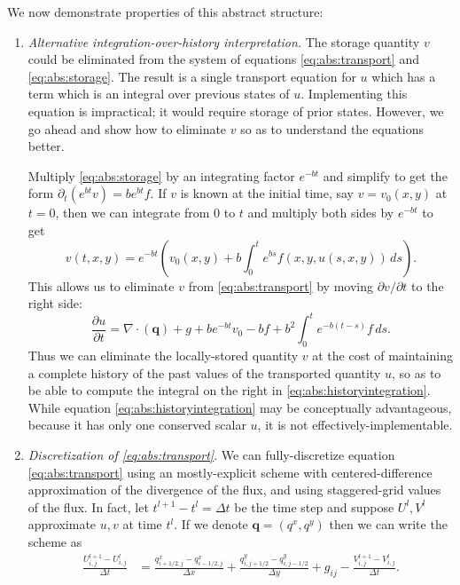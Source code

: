 \documentclass[11pt,final]{amsart}
\newcommand\bq{\mathbf{q}}
\newcommand{\Div}{\nabla\cdot}
\begin{document}
We now demonstrate properties of this abstract structure:

\renewcommand{\labelenumi}{\arabic{enumi}.\quad}

\begin{enumerate}
\item  \emph{Alternative integration-over-history interpretation.}  The storage quantity $v$ could be eliminated from the system of equations \eqref{eq:abs:transport} and \eqref{eq:abs:storage}.  The result is a single transport equation for $u$ which has a term which is an integral over previous states of $u$.  Implementing this equation is impractical; it would require storage of prior states.  However, we go ahead and show how to eliminate $v$ so as to understand the equations better.  

Multiply \eqref{eq:abs:storage} by an integrating factor $e^{-bt}$ and simplify to get the form $\partial_t (e^{bt} v) = b e^{bt} f$.  If $v$ is known at the initial time, say $v=v_0(x,y)$ at $t=0$, then we can integrate from $0$ to $t$ and multiply both sides by $e^{-bt}$ to get
\begin{equation}
v(t,x,y) = e^{-bt} \left(v_0(x,y) + b \int_0^t e^{bs} f(x,y,u(s,x,y))\,ds\right). \label{eq:abs:vexpression}
\end{equation}
This allows us to eliminate $v$ from \eqref{eq:abs:transport} by moving $\partial v/\partial t$ to the right side:
\begin{equation}
\frac{\partial u}{\partial t} = \Div \left(\mathbf{q}\right) + g + b e^{-bt} v_0 - b f + b^2 \int_0^t e^{-b(t-s)} f\,ds. \label{eq:abs:historyintegration} 
\end{equation}
Thus we can eliminate the locally-stored quantity $v$ at the cost of maintaining a complete history of the past values of the transported quantity $u$, so as to be able to compute the integral on the right in \eqref{eq:abs:historyintegration}.  While equation \eqref{eq:abs:historyintegration} may be conceptually advantageous, because it has only one conserved scalar $u$, it is not effectively-implementable.
\medskip

\item \emph{Discretization of \eqref{eq:abs:transport}}.  We can fully-discretize equation \eqref{eq:abs:transport} using an mostly-explicit scheme with centered-difference approximation of the divergence of the flux, and using staggered-grid values of the flux.  In fact, let $t^{l+1}-t^l = \Delta t$ be the time step and suppose $U^l,V^l$ approximate $u,v$ at time $t^l$.  If we denote $\bq = (q^x,q^y)$ then we can write the scheme as
\begin{align}
\frac{U_{i,j}^{l+1} - U_{i,j}^l}{\Delta t} &= \frac{q^x_{i+1/2,j} - q^x_{i-1/2,j}}{\Delta x} + \frac{q^y_{i,j+1/2} - q^y_{i,j-1/2}}{\Delta y} + g_{ij} - \frac{V_{i,j}^{l+1} - V_{i,j}^l}{\Delta t}. \label{eq:abs:conservefd}
\end{align}


\end{enumerate}
\end{document}

